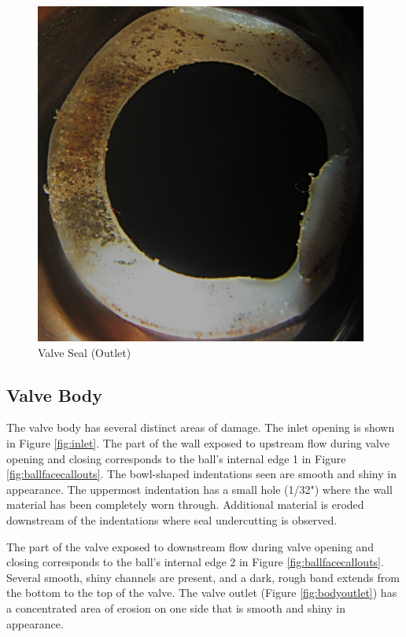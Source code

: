 \documentclass[]{article}
\begin{document}
\begin{figure}[h]
	\centering
	\includegraphics[width=0.4\linewidth]{Photos/Outlet_seal}
	\caption{Valve Seal (Outlet)}
	\label{fig:outletseal}
\end{figure}


\subsection{Valve Body}
The valve body has several distinct areas of damage. The inlet opening is shown in Figure \ref{fig:inlet}. The part of the wall exposed to upstream flow during valve opening and closing corresponds to the ball's internal edge 1 in Figure \ref{fig:ballfacecallouts}. The bowl-shaped indentations seen are smooth and shiny in appearance. The uppermost indentation has a small hole (1/32") where the wall material has been completely worn through. Additional material is eroded downstream of the indentations where seal undercutting is observed. 

The part of the valve exposed to downstream flow during valve opening and closing corresponds to the ball's internal edge 2  in Figure \ref{fig:ballfacecallouts}. Several smooth, shiny channels are present, and a dark, rough band extends from the bottom to the top of the valve. The valve outlet (Figure \ref{fig:bodyoutlet}) has a concentrated area of erosion on one side that is smooth and shiny in appearance.
\end{document}
